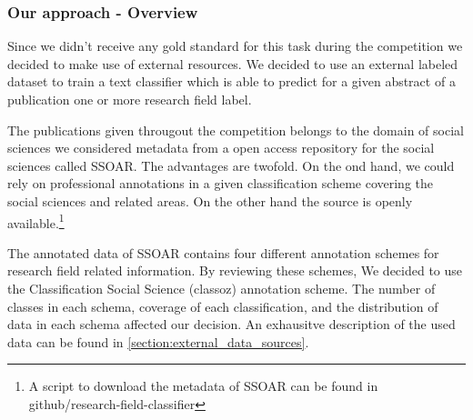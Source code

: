 \subsubsection{Our approach - Overview}
Since we didn't receive any gold standard for this task during the competition we decided to make use of external resources.
We decided to use an external labeled dataset to train a text classifier which is able to predict for a given abstract of a publication one or more research field label.

The publications given througout the competition belongs to the domain of social sciences we considered metadata from a open access repository for the social sciences called SSOAR.
The advantages are twofold.
On the ond hand, we could rely on professional annotations in a given classification scheme covering the social sciences and related areas.
On the other hand the source is openly available.\footnote{A script to download the metadata of SSOAR can be found in github/research-field-classifier}

The annotated data of SSOAR contains four different annotation schemes for research field related information. By reviewing these schemes, We decided to use the Classification Social Science (classoz) annotation scheme. The number of classes in each schema, coverage of each classification, and the distribution of data in each schema affected our decision. 
An exhausitve description of the used data can be found in \ref{section:external_data_sources}.

